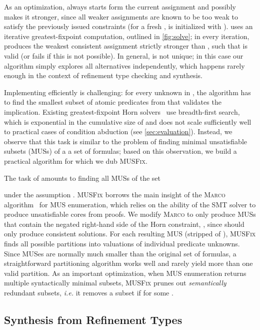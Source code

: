\documentclass[10pt,preprint]{sigplanconf-pldi16}
\makeatletter
\theoremstyle{definition}
\newcommand{\ie}{\textit{i.e.}\@\xspace}
\makeatother
\begin{document}
As an optimization,  always starts form the current assignment  and possibly makes it stronger, 
since all weaker assignments are known to be too weak to satisfy the previously issued constraints
(for a fresh ,  is initialized with ). 
 uses an iterative greatest-fixpoint computation, outlined in \autoref{fig:solve};
in every iteration,  produces the weakest consistent assignment  
strictly stronger than ,
such that  is valid
(or fails if this is not possible).
In general,  is not unique;
in this case our algorithm simply explores all alternatives independently,
which happens rarely enough in the context of refinement type checking and synthesis.

Implementing  efficiently is challenging:
for every unknown  in ,
the algorithm has to find the smallest subset of atomic predicates from 
 that validates the implication.
Existing greatest-fixpoint Horn solvers~\cite{SrivastavaGu09} use breadth-first search,
which is exponential in the cumulative size of 
and does not scale sufficiently well to practical cases of condition abduction (see \autoref{sec:evaluation}).
Instead, we observe that this task is similar to the problem of finding minimal unsatisfiable subsets (MUSs) of a a set of formulas;
based on this observation, we build a practical algorithm for  which we dub \textsc{MUSFix}.

The task of  amounts to finding all MUSs of the set

under the assumption .
\textsc{MUSFix} borrows the main insight of the \textsc{Marco} algorithm~\cite{LiffitonPrMaMa15} for MUS enumeration,
which relies on the ability of the SMT solver to produce unsatisfiable cores from proofs.
We modify \textsc{Marco} to only produce MUSs 
that contain the negated right-hand side of the Horn constraint, ,
since  should only produce consistent solutions.
For each resulting MUS (stripped of ),
\textsc{MUSFix} finds all possible partitions into valuations of individual predicate unknowns.
Since MUSes are normally much smaller than the original set of formulas, 
a straightforward partitioning algorithm works well and rarely yield more than one valid partition.
As an important optimization,
when MUS enumeration returns multiple syntactically minimal subsets,
\textsc{MUSFix} prunes out \emph{semantically} redundant subsets,
\ie it removes a subset  if  for some .


\subsection{Synthesis from Refinement Types}\label{sec:theory:synthesis}
\end{document}
